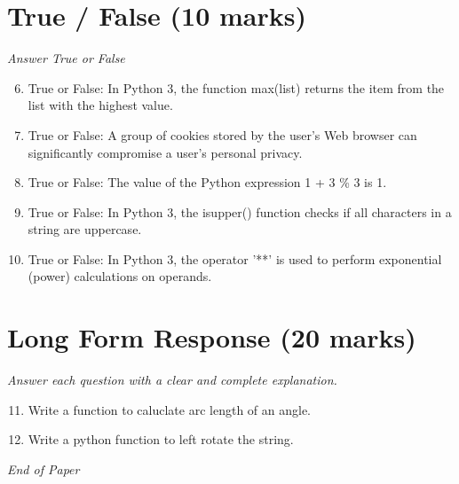 \documentclass[12pt]{article}
\begin{document}
\section*{True / False (10 marks)}
\textit{Answer True or False}
\begin{enumerate}[label=\arabic*.]
\setcounter{enumi}{5}
\item True or False: In Python 3, the function max(list) returns the item from the list with the highest value.
\item True or False: A group of cookies stored by the user's Web browser can significantly compromise a user's personal privacy.
\item True or False: The value of the Python expression 1 + 3 \% 3 is 1.
\item True or False: In Python 3, the isupper() function checks if all characters in a string are uppercase.
\item True or False: In Python 3, the operator '**' is used to perform exponential (power) calculations on operands.
\end{enumerate}

\section*{Long Form Response (20 marks)}
\textit{Answer each question with a clear and complete explanation.}
\begin{enumerate}[label=\arabic*.]
\setcounter{enumi}{10}
\item Write a function to caluclate arc length of an angle.
\item Write a python function to left rotate the string.
\end{enumerate}

\vfill
\noindent\textit{End of Paper}
\end{document}

